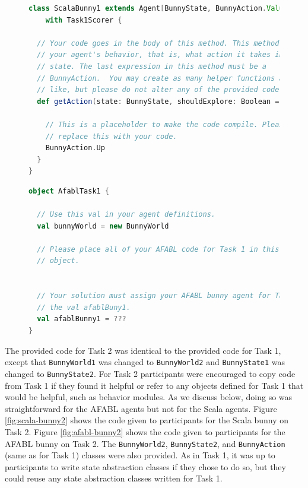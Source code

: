 \begin{figure}[h]
\begin{center}

\begin{lstlisting}[language=Scala]
class ScalaBunny1 extends Agent[BunnyState, BunnyAction.Value]
    with Task1Scorer {

  // Your code goes in the body of this method. This method defines
  // your agent's behavior, that is, what action it takes in a given
  // state. The last expression in this method must be a
  // BunnyAction.  You may create as many helper functions as you
  // like, but please do not alter any of the provided code.
  def getAction(state: BunnyState, shouldExplore: Boolean = false) = {

    // This is a placeholder to make the code compile. Please
    // replace this with your code.
    BunnyAction.Up
  }
}
\end{lstlisting}

\caption{}
\end{center}
\label{fig:scala-task1-provided}
\end{figure}


\begin{figure}[h]
\begin{center}

\begin{lstlisting}[language=Scala]
object AfablTask1 {

  // Use this val in your agent definitions.
  val bunnyWorld = new BunnyWorld

  // Please place all of your AFABL code for Task 1 in this singleton
  // object.


  // Your solution must assign your AFABL bunny agent for Task 1 to
  // the val afablBuny1.
  val afablBunny1 = ???
}
\end{lstlisting}

\caption{}
\end{center}
\label{fig:afabl-task1-provided}
\end{figure}


The provided code for Task 2 was identical to the provided code for Task 1, except that {\tt BunnyWorld1} was changed to {\tt BunnyWorld2} and {\tt BunnyState1} was changed to {\tt BunnyState2}. For Task 2 participants were encouraged to copy code from Task 1 if they found it helpful or refer to any objects defined for Task 1 that would be helpful, such as behavior modules. As we discuss below, doing so was straightforward for the AFABL agents but not for the Scala agents. Figure \ref{fig:scala-bunny2} shows the code given to participants for the Scala bunny on Task 2. Figure \ref{fig:afabl-bunny2} shows the code given to participants for the AFABL bunny on Task 2. The {\tt BunnyWorld2}, {\tt BunnyState2}, and {\tt BunnyAction} (same as for Task 1) classes were also provided. As in Task 1, it was up to participants to write state abstraction classes if they chose to do so, but they could reuse any state abstraction classes written for Task 1.

